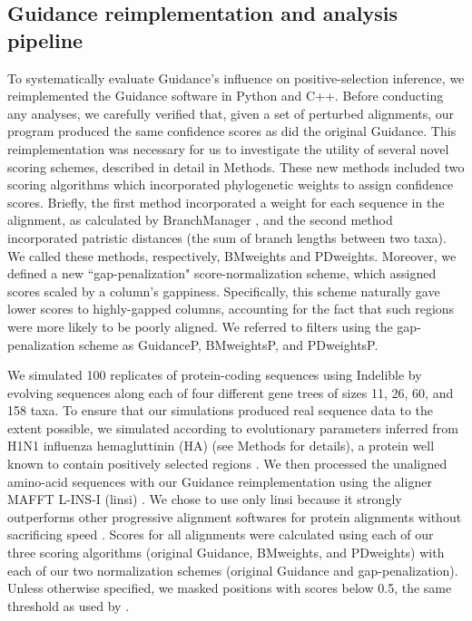 \documentclass[11pt]{article}
\begin{document}
\subsection*{Guidance reimplementation and analysis pipeline}
To systematically evaluate Guidance's influence on positive-selection inference, we reimplemented the Guidance software in Python and C++. Before conducting any analyses, we carefully verified that, given a set of perturbed alignments, our program produced the same confidence scores as did the original Guidance. This reimplementation was necessary for us to investigate the utility of several novel scoring schemes, described in detail in Methods. These new methods included two scoring algorithms which incorporated phylogenetic weights to assign confidence scores. Briefly, the first method incorporated a weight for each sequence in the alignment, as calculated by BranchManager \citep{Stone2007}, and the second method incorporated patristic distances (the sum of branch lengths between two taxa). We called these methods, respectively, BMweights and PDweights. Moreover, we defined a new ``gap-penalization" score-normalization scheme, which assigned scores scaled by a column's gappiness. Specifically, this scheme naturally gave lower scores to highly-gapped columns, accounting for the fact that such regions were more likely to be poorly aligned. We referred to filters using the gap-penalization scheme as GuidanceP, BMweightsP, and PDweightsP.

We simulated 100 replicates of protein-coding sequences using Indelible \citep{Fletcher2009} by evolving sequences along each of four different gene trees of sizes 11, 26, 60, and 158 taxa. To ensure that our simulations produced real sequence data to the extent possible, we simulated according to evolutionary parameters inferred from H1N1 influenza hemagluttinin (HA) (see Methods for details), a protein well known to contain positively selected regions \citep{Bush1999, Kryazhimskiy2008, Meyer2012}. We then processed the unaligned amino-acid sequences with our Guidance reimplementation using the aligner MAFFT L-INS-I (linsi) \citep{Katoh2005}. We chose to use only linsi because it strongly outperforms other progressive alignment softwares for protein alignments without sacrificing speed \citep{Nuin2006,Thompson2011}. Scores for all alignments were calculated using each of our three scoring algorithms (original Guidance, BMweights, and PDweights) with each of our two normalization schemes (original Guidance and gap-penalization). Unless otherwise specified, we masked positions with scores below 0.5, the same threshold as used by \citet{Jordan2012}. 
\end{document}
